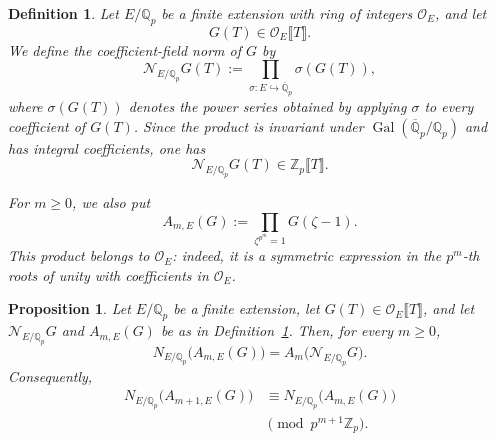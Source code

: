 \documentclass[11pt,table]{amsart}
\newtheorem{definition}[theorem]{Definition}
\newtheorem{proposition}[theorem]{Proposition}
\numberwithin{equation}{section}
\begin{document}
\begin{definition}\label{def:coefficient-field-norm}
Let $E/\mathbb Q_p$ be a finite extension with ring of integers
$\mathcal O_E$, and let
\[
        G(T)\in\mathcal O_E\llbracket T\rrbracket.
\]
We define the \emph{coefficient-field norm} of $G$ by
\[
        \mathcal N_{E/\mathbb Q_p}G(T)
        :=
        \prod_{\sigma:E\hookrightarrow\overline{\mathbb Q}_p}
        \sigma(G(T)),
\]
where $\sigma(G(T))$ denotes the power series obtained by applying
$\sigma$ to every coefficient of $G(T)$.  Since the product is invariant
under $\operatorname{Gal}(\overline{\mathbb Q}_p/\mathbb Q_p)$ and has
integral coefficients, one has
\[
        \mathcal N_{E/\mathbb Q_p}G(T)
        \in\mathbb Z_p\llbracket T\rrbracket.
\]

For $m\geq0$, we also put
\[
        A_{m,E}(G)
        :=
        \prod_{\zeta^{p^m}=1}G(\zeta-1).
\]
This product belongs to $\mathcal O_E$: indeed, it is a symmetric
expression in the $p^m$-th roots of unity with coefficients in
$\mathcal O_E$.
\end{definition}

\begin{proposition}\label{prop:coefficient-norm}
Let $E/\mathbb Q_p$ be a finite extension, let
$G(T)\in\mathcal O_E\llbracket T\rrbracket$, and let
$\mathcal N_{E/\mathbb Q_p}G$ and $A_{m,E}(G)$ be as in
Definition~\ref{def:coefficient-field-norm}.  Then, for every $m\geq0$,
\begin{equation}\label{eq:coefficient-norm-Am}
        N_{E/\mathbb Q_p}\bigl(A_{m,E}(G)\bigr)
        =
        A_m\bigl(\mathcal N_{E/\mathbb Q_p}G\bigr).
\end{equation}
Consequently,
\begin{equation}\label{eq:coefficient-norm-congruence}
\begin{split}
        N_{E/\mathbb Q_p}\bigl(A_{m+1,E}(G)\bigr)
        &\equiv
        N_{E/\mathbb Q_p}\bigl(A_{m,E}(G)\bigr)\\
        &\pmod{p^{m+1}\mathbb Z_p}.
\end{split}
\end{equation}
\end{proposition}
\end{document}
